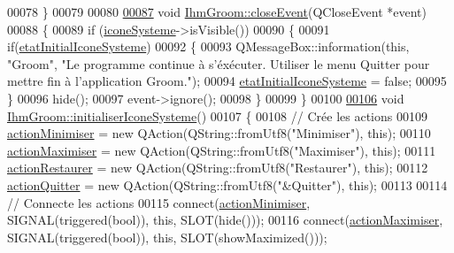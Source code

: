 \begin{DoxyCode}
00078 \}
00079 
00080 
\hyperlink{class_ihm_groom_a8063930f323ce85b679c7598742f325d}{00087} \textcolor{keywordtype}{void} \hyperlink{class_ihm_groom_a8063930f323ce85b679c7598742f325d}{IhmGroom::closeEvent}(QCloseEvent *event)
00088 \{
00089     \textcolor{keywordflow}{if} (\hyperlink{class_ihm_groom_a9ca0929cf284a9a2e3e2bc3489249919}{iconeSysteme}->isVisible())
00090     \{
00091         \textcolor{keywordflow}{if}(\hyperlink{class_ihm_groom_a95d2d2b4b3b849c1b21f234844fca056}{etatInitialIconeSysteme})
00092         \{
00093             QMessageBox::information(\textcolor{keyword}{this}, \textcolor{stringliteral}{"Groom"}, \textcolor{stringliteral}{"Le programme continue à s'éxécuter. Utiliser le menu
       Quitter pour mettre fin à l'application Groom."});
00094             \hyperlink{class_ihm_groom_a95d2d2b4b3b849c1b21f234844fca056}{etatInitialIconeSysteme} = \textcolor{keyword}{false};
00095         \}
00096         hide();
00097         \textcolor{keyword}{event}->ignore();
00098     \}
00099 \}
00100 
\hyperlink{class_ihm_groom_addfe25c3da6ddecfbdcb5b3cf062d724}{00106} \textcolor{keywordtype}{void} \hyperlink{class_ihm_groom_addfe25c3da6ddecfbdcb5b3cf062d724}{IhmGroom::initialiserIconeSysteme}()
00107 \{
00108     \textcolor{comment}{// Crée les actions}
00109     \hyperlink{class_ihm_groom_a4018ccf7f73329725e4c54002ae72f01}{actionMinimiser} = \textcolor{keyword}{new} QAction(QString::fromUtf8(\textcolor{stringliteral}{"Minimiser"}), \textcolor{keyword}{this});
00110     \hyperlink{class_ihm_groom_aa23dc46d5e223aa20bb84b5bd99d3b81}{actionMaximiser} = \textcolor{keyword}{new} QAction(QString::fromUtf8(\textcolor{stringliteral}{"Maximiser"}), \textcolor{keyword}{this});
00111     \hyperlink{class_ihm_groom_aa2df6badfa16f802411b502228fb8704}{actionRestaurer} = \textcolor{keyword}{new} QAction(QString::fromUtf8(\textcolor{stringliteral}{"Restaurer"}), \textcolor{keyword}{this});
00112     \hyperlink{class_ihm_groom_ab28c091688d25e93b2baf99b4aa90f07}{actionQuitter} = \textcolor{keyword}{new} QAction(QString::fromUtf8(\textcolor{stringliteral}{"&Quitter"}), \textcolor{keyword}{this});
00113 
00114     \textcolor{comment}{// Connecte les actions}
00115     connect(\hyperlink{class_ihm_groom_a4018ccf7f73329725e4c54002ae72f01}{actionMinimiser}, SIGNAL(triggered(\textcolor{keywordtype}{bool})), \textcolor{keyword}{this}, SLOT(hide()));
00116     connect(\hyperlink{class_ihm_groom_aa23dc46d5e223aa20bb84b5bd99d3b81}{actionMaximiser}, SIGNAL(triggered(\textcolor{keywordtype}{bool})), \textcolor{keyword}{this}, SLOT(showMaximized()));

\end{DoxyCode}
